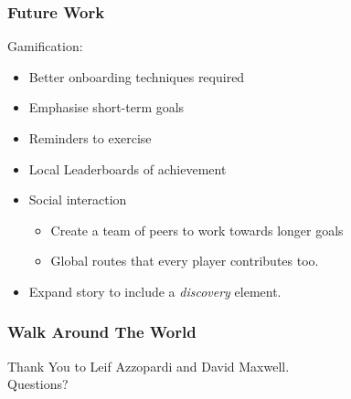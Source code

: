 \documentclass{beamer}
\begin{document}
\begin{frame}
  \frametitle{Future Work}
  Gamification:
  \begin{itemize}
    \item Better onboarding techniques required
    \item Emphasise short-term goals 
    \item Reminders to exercise
    \item Local Leaderboards of achievement
    \item Social interaction
      \begin{itemize}
        \item Create a team of peers to work towards longer goals
        \item Global routes that every player contributes too.
      \end{itemize}
    \item Expand story to include a \emph{discovery} element.
  \end{itemize}
\end{frame}

\begin{frame}
  \frametitle{Walk Around The World}
  \begin{center}
    Thank You to Leif Azzopardi and David Maxwell.
    \\
    Questions?
  \end{center}
\end{frame}
\end{document}
